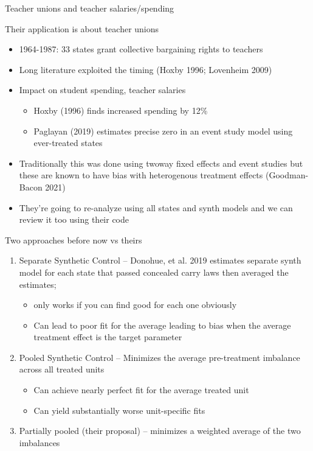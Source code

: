 \documentclass{beamer}
\begin{document}
\begin{frame}{Teacher unions and teacher salaries/spending}

Their application is about teacher unions
\begin{itemize}
\item 1964-1987: 33 states grant collective bargaining rights to teachers
\item Long literature exploited the timing (Hoxby 1996; Lovenheim 2009)
\item Impact on student spending, teacher salaries
	\begin{itemize}
	\item Hoxby (1996) finds increased spending by 12\%
	\item Paglayan (2019) estimates precise zero in an event study model using ever-treated states
	\end{itemize}
\item Traditionally this was done using twoway fixed effects and event studies but these are known to have bias with heterogenous treatment effects (Goodman-Bacon 2021)
\item They're going to re-analyze using all states and synth models and we can review it too using their code
\end{itemize}

\end{frame}








\begin{frame}{Two approaches before now vs theirs}

\begin{enumerate}

\item Separate Synthetic Control -- Donohue, et al. 2019 estimates separate synth model for each state that passed concealed carry laws then averaged the estimates;
	\begin{itemize}
	\item  only works if you can find good for each one obviously
	\item Can lead to poor fit for the average leading to bias when the average treatment effect is the target parameter
	\end{itemize}
\item Pooled Synthetic Control -- Minimizes the average pre-treatment imbalance across all treated units
	\begin{itemize}
	\item Can achieve nearly perfect fit for the average treated unit
	\item Can yield substantially worse unit-specific fits
	\end{itemize}
\item Partially pooled (their proposal) -- minimizes a weighted average of the two imbalances

\end{enumerate}

\end{frame}
\end{document}
